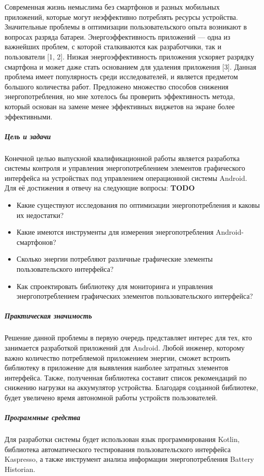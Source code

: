 

Современная жизнь немыслима без смартфонов и разных мобильных приложений, которые могут неэффективно потреблять ресурсы устройства. Значительные проблемы в оптимизации пользовательского опыта возникают в вопросах разряда батареи. Энергоэффективность приложений --- одна из важнейших проблем, с которой сталкиваются как разработчики, так и пользователи [1, 2]. Низкая энергоэффективность приложения ускоряет разрядку смартфона и может даже стать основанием для удаления приложения [3]. Данная проблема имеет популярность среди исследователей, и является предметом большого количества работ. Предложено множество способов снижения энергопотребления, но мне хотелось бы проверить эффективность метода, который основан на замене менее эффективных виджетов на экране более эффективными.

\subparagraph{Цель и задачи}
Конечной целью выпускной квалификационной работы является разработка системы контроля и управления энергопотреблением элементов графического интерфейса на устройствах под управлением операционной системы Android. Для её достижения я отвечу на следующие вопросы:
\textbf{\Huge TODO}
\begin{itemize}
	\item Какие существуют исследования по оптимизации энергопотребления и каковы их недостатки?
	\item Какие имеются инструменты для измерения энергопотребления Android-смартфонов?
	\item Сколько энергии потребляют различные графические элементы пользовательского интерфейса?
	\item Как спроектировать библиотеку для мониторинга и управления энергопотреблением графических элементов пользовательского интерфейса?
\end{itemize}

\subparagraph{Практическая значимость}
Решение данной проблемы в первую очередь представляет интерес для тех, кто занимается разработкой приложений для Android. Любой инженер, которому важно количество потребляемой приложением энергии, сможет встроить библиотеку в приложение для выявления наиболее затратных элементов интерфейса. Также, полученная библиотека составит список рекомендаций по снижению нагрузки на аккумулятор устройства. Благодаря созданной библиотеке, будет увеличено время автономной работы устройств пользователей.

\subparagraph{Программные средства}
Для разработки системы будет использован язык программирования Kotlin, библиотека автоматического тестирования пользовательского интерфейса Kaspresso, а также инструмент анализа информации энергопотребления Battery Historian.